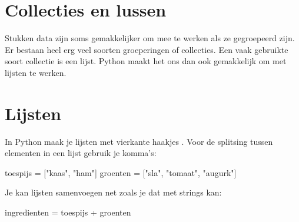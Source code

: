 
\section*{Collecties en lussen}
  Stukken data zijn soms gemakkelijker om mee te werken als ze gegroepeerd zijn.
  Er bestaan heel erg veel soorten groeperingen of collecties. Een vaak
  gebruikte soort collectie is een lijst. Python maakt het ons dan ook
  gemakkelijk om met lijsten te werken.

\section{Lijsten}
  In Python maak je lijsten met vierkante haakjes \py{[\,]}. Voor de splitsing
  tussen elementen in een lijst gebruik je komma's:
  \begin{python}
    toespijs = ["kaas", "ham"]
    groenten = ["sla", "tomaat", "augurk"]
  \end{python}
  Je kan lijsten samenvoegen net zoals je dat met strings kan:
  \begin{python}
    ingredienten = toespijs + groenten
  \end{python}

